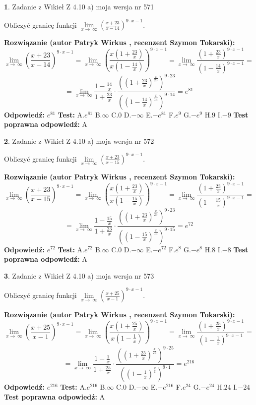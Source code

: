 \documentclass[12pt, a4paper]{article}
\theoremstyle{definition} %
\newtheorem{zad}{}
\newcommand{\zadStart}[1]{\begin{zad}#1\newline}
\newcommand{\zadStop}{\end{zad}}
\newcommand{\rozwStart}[2]{\noindent \textbf{Rozwiązanie (autor #1 , recenzent #2): }\newline}
\newcommand{\rozwStop}{\newline}
\newcommand{\odpStart}{\noindent \textbf{Odpowiedź:}\newline}
\newcommand{\odpStop}{\newline}
\newcommand{\testStart}{\noindent \textbf{Test:}\newline}
\newcommand{\testStop}{\newline}
\newcommand{\kluczStart}{\noindent \textbf{Test poprawna odpowiedź:}\newline}
\newcommand{\kluczStop}{\newline}
\begin{document}
\zadStart{Zadanie z Wikieł Z 4.10 a) moja wersja nr 571}

Obliczyć granicę funkcji  $\lim\limits_{x\to\ \infty}(\frac{x+23}{x-14})^{9\cdot x-1}$.
\zadStop
\rozwStart{Patryk Wirkus}{Szymon Tokarski}
$$\lim\limits_{x\to\ \infty}(\frac{x+23}{x-14})^{9\cdot x-1} = \lim\limits_{x\to\ \infty}(\frac{x(1+\frac{23}{x})}{x(1-\frac{14}{x})})^{9\cdot x-1}=\lim\limits_{x\to\ \infty}\frac{(1+\frac{23}{x})^{9\cdot x-1}}{(1-\frac{14}{x})^{9\cdot x-1}}=$$
$$=\lim\limits_{x\to\ \infty}\frac{1-\frac{14}{x}}{1+\frac{23}{x}}\cdot\frac{((1+\frac{23}{x})^{\frac{x}{23}})^{9\cdot23}}{((1-\frac{14}{x})^{\frac{x}{14}})^{9\cdot14}}=e^{81}$$
\rozwStop
\odpStart
$e^{81}$
\odpStop
\testStart
A.$e^{81}$ B.$\infty$ C.$0$ D.$-\infty$ E.$-e^{81}$
F.$e^{9}$ G.$-e^{9}$
H.$9$
I.$-9$
\testStop
\kluczStart
A
\kluczStop



\zadStart{Zadanie z Wikieł Z 4.10 a) moja wersja nr 572}

Obliczyć granicę funkcji  $\lim\limits_{x\to\ \infty}(\frac{x+23}{x-15})^{9\cdot x-1}$.
\zadStop
\rozwStart{Patryk Wirkus}{Szymon Tokarski}
$$\lim\limits_{x\to\ \infty}(\frac{x+23}{x-15})^{9\cdot x-1} = \lim\limits_{x\to\ \infty}(\frac{x(1+\frac{23}{x})}{x(1-\frac{15}{x})})^{9\cdot x-1}=\lim\limits_{x\to\ \infty}\frac{(1+\frac{23}{x})^{9\cdot x-1}}{(1-\frac{15}{x})^{9\cdot x-1}}=$$
$$=\lim\limits_{x\to\ \infty}\frac{1-\frac{15}{x}}{1+\frac{23}{x}}\cdot\frac{((1+\frac{23}{x})^{\frac{x}{23}})^{9\cdot23}}{((1-\frac{15}{x})^{\frac{x}{15}})^{9\cdot15}}=e^{72}$$
\rozwStop
\odpStart
$e^{72}$
\odpStop
\testStart
A.$e^{72}$ B.$\infty$ C.$0$ D.$-\infty$ E.$-e^{72}$
F.$e^{8}$ G.$-e^{8}$
H.$8$
I.$-8$
\testStop
\kluczStart
A
\kluczStop



\zadStart{Zadanie z Wikieł Z 4.10 a) moja wersja nr 573}

Obliczyć granicę funkcji  $\lim\limits_{x\to\ \infty}(\frac{x+25}{x-1})^{9\cdot x-1}$.
\zadStop
\rozwStart{Patryk Wirkus}{Szymon Tokarski}
$$\lim\limits_{x\to\ \infty}(\frac{x+25}{x-1})^{9\cdot x-1} = \lim\limits_{x\to\ \infty}(\frac{x(1+\frac{25}{x})}{x(1-\frac{1}{x})})^{9\cdot x-1}=\lim\limits_{x\to\ \infty}\frac{(1+\frac{25}{x})^{9\cdot x-1}}{(1-\frac{1}{x})^{9\cdot x-1}}=$$
$$=\lim\limits_{x\to\ \infty}\frac{1-\frac{1}{x}}{1+\frac{25}{x}}\cdot\frac{((1+\frac{25}{x})^{\frac{x}{25}})^{9\cdot25}}{((1-\frac{1}{x})^{\frac{x}{1}})^{9\cdot1}}=e^{216}$$
\rozwStop
\odpStart
$e^{216}$
\odpStop
\testStart
A.$e^{216}$ B.$\infty$ C.$0$ D.$-\infty$ E.$-e^{216}$
F.$e^{24}$ G.$-e^{24}$
H.$24$
I.$-24$
\testStop
\kluczStart
A
\kluczStop
\end{document}
